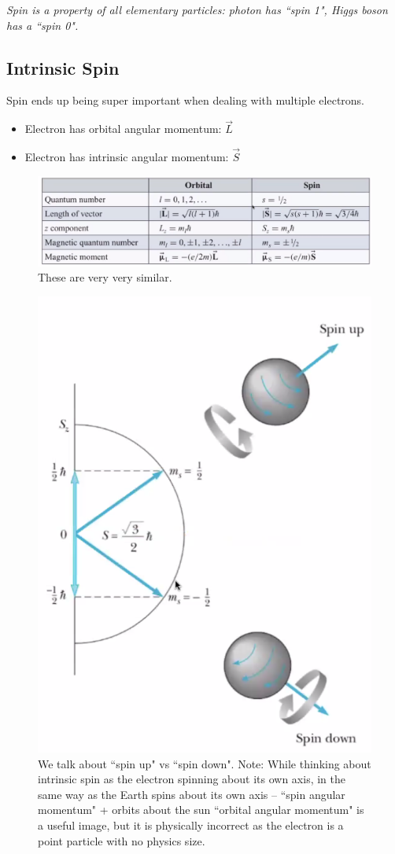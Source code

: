 \documentclass[class=article,crop=false]{standalone}
\begin{document}
\emph{Spin is a property of all elementary particles: photon has ``spin 1", Higgs boson has a ``spin 0".} \\

\subsection{Intrinsic Spin}

Spin ends up being super important when dealing with multiple electrons. \\

\begin{itemize}
	\item Electron has orbital angular momentum: $ \vec{L} $
	\item Electron has intrinsic angular momentum: $ \vec{S} $
\end{itemize}

\begin{figure}[h!]
	\centering
	\includegraphics[width=1\linewidth]{./Images/spin.png}
	\caption{These are very very similar.}
\end{figure}


\begin{figure}[h!]
	\centering
	\includegraphics[width=.45\linewidth]{./Images/spin_up.png}
	\caption{We talk about ``spin up" vs ``spin down". Note: While thinking about intrinsic spin as the electron spinning about its own axis, in the same way as the Earth spins about its own axis -- ``spin angular momentum" + orbits about the sun ``orbital angular momentum" is a useful image, but it is physically incorrect as the electron is a point particle with no physics size.}
\end{figure}
\end{document}

